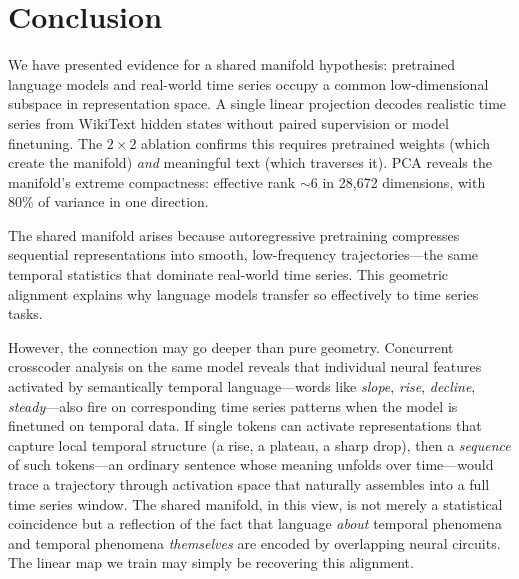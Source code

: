 \documentclass[11pt,a4paper]{article}
\begin{document}
\section{Conclusion}

We have presented evidence for a shared manifold hypothesis: pretrained language models and real-world time series occupy a common low-dimensional subspace in representation space. A single linear projection decodes realistic time series from WikiText hidden states without paired supervision or model finetuning. The $2 \times 2$ ablation confirms this requires pretrained weights (which create the manifold) \textit{and} meaningful text (which traverses it). PCA reveals the manifold's extreme compactness: effective rank $\sim$6 in 28{,}672 dimensions, with 80\% of variance in one direction.

The shared manifold arises because autoregressive pretraining compresses sequential representations into smooth, low-frequency trajectories---the same temporal statistics that dominate real-world time series. This geometric alignment explains why language models transfer so effectively to time series tasks.

However, the connection may go deeper than pure geometry. Concurrent crosscoder analysis on the same model reveals that individual neural features activated by semantically temporal language---words like \textit{slope}, \textit{rise}, \textit{decline}, \textit{steady}---also fire on corresponding time series patterns when the model is finetuned on temporal data. If single tokens can activate representations that capture local temporal structure (a rise, a plateau, a sharp drop), then a \textit{sequence} of such tokens---an ordinary sentence whose meaning unfolds over time---would trace a trajectory through activation space that naturally assembles into a full time series window. The shared manifold, in this view, is not merely a statistical coincidence but a reflection of the fact that language \textit{about} temporal phenomena and temporal phenomena \textit{themselves} are encoded by overlapping neural circuits. The linear map we train may simply be recovering this alignment.
\end{document}
